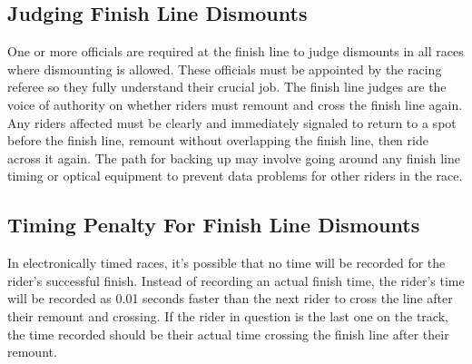 \subsection{Judging Finish Line Dismounts}
One or more officials are required at the finish line to judge dismounts in all races where dismounting is allowed.
These officials must be appointed by the racing referee so they fully understand their crucial job.
The finish line judges are the voice of authority on whether riders must remount and cross the finish line again.
Any riders affected must be clearly and immediately signaled to return to a spot before the finish line, remount without overlapping the finish line, then ride across it again.
The path for backing up may involve going around any finish line timing or optical equipment to prevent data problems for other riders in the race.

\subsection{Timing Penalty For Finish Line Dismounts}
In electronically timed races, it's possible that no time will be recorded for the rider's successful finish.
Instead of recording an actual finish time, the rider's time will be recorded as 0.01 seconds faster than the next rider to cross the line after their remount and crossing.
If the rider in question is the last one on the track, the time recorded should be their actual time crossing the finish line after their remount.
